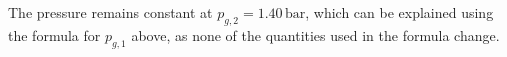 The pressure remains constant at \( p_{g,2} = 1.40 \, \text{bar} \), which can be explained using the formula for \( p_{g,1} \) above, as none of the quantities used in the formula change.
